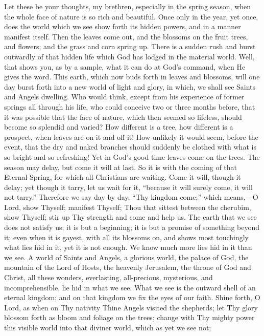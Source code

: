 Let these be your thoughts, my brethren, especially in the spring
season, when the whole face of nature is so rich and beautiful. Once
only in the year, yet once, does the world which we see show forth its
hidden powers, and in a manner manifest itself. Then the leaves come
out, and the blossoms on the fruit trees, and flowers; and the grass
and corn spring up. There is a sudden rush and burst outwardly of that
hidden life which God has lodged in the material world. Well, that
shows you, as by a sample, what it can do at God's command, when He
gives the word. This earth, which now buds forth in leaves and
blossoms, will one day burst forth into a new world of light and
glory, in which, we shall see Saints and Angels dwelling. Who would
think, except from his experience of former springs all through his
life, who could conceive two or three months before, that it was
possible that the face of nature, which then seemed so lifeless,
should become so splendid and varied? How different is a tree, how
different is a prospect, when leaves are on it and off it! How
unlikely it would seem, before the event, that the dry and naked
branches should suddenly be clothed with what is so bright and so
refreshing! Yet in God's good time leaves come on the trees. The
season may delay, but come it will at last. So it is with the coming
of that Eternal Spring, for which all Christians are waiting. Come it
will, though it delay; yet though it tarry, let us wait for it,
``because it will surely come, it will not tarry.'' Therefore
we say day by day, ``Thy kingdom come;'' which means,—O
Lord, show Thyself; manifest Thyself; Thou that sittest between the
cherubim, show Thyself; stir up Thy strength and come and help us. The
earth that we see does not satisfy us; it is but a beginning; it is
but a promise of something beyond it; even when it is gayest, with all
its blossoms on, and shows most touchingly what lies hid in it, yet it
is not enough. We know much more lies hid in it than we see. A world
of Saints and Angels, a glorious world, the palace of God, the
mountain of the Lord of Hosts, the heavenly Jerusalem, the throne of
God and Christ, all these wonders, everlasting, all-precious,
mysterious, and incomprehensible, lie hid in what we see. What we see
is the outward shell of an eternal kingdom; and on that kingdom we fix
the eyes of our faith. Shine forth, O Lord, as when on Thy nativity
Thine Angels visited the shepherds; let Thy glory blossom forth as
bloom and foliage on the trees; change with Thy mighty power this
visible world into that diviner world, which as yet we see not;
